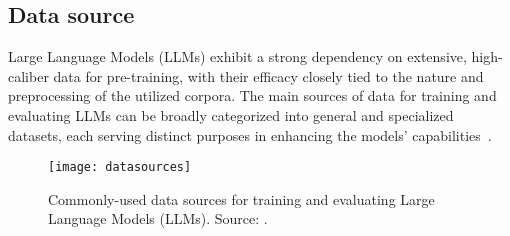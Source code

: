 \subsection{Data source}
\label{subsec:data-source}

Large Language Models (LLMs) exhibit a strong dependency on extensive, high-caliber data for pre-training, with their efficacy closely tied to the nature and preprocessing of the utilized corpora.
The main sources of data for training and evaluating LLMs can be broadly categorized into general and specialized datasets, each serving distinct purposes in enhancing the models' capabilities~\cite{survey}.\\

\begin{figure}[h]
	\centering
	\texttt{[image: datasources]}
	\caption{Commonly-used data sources for training and evaluating Large Language Models (LLMs). Source: \textcite{survey}.}
	\label{fig:data_sources}
\end{figure}

